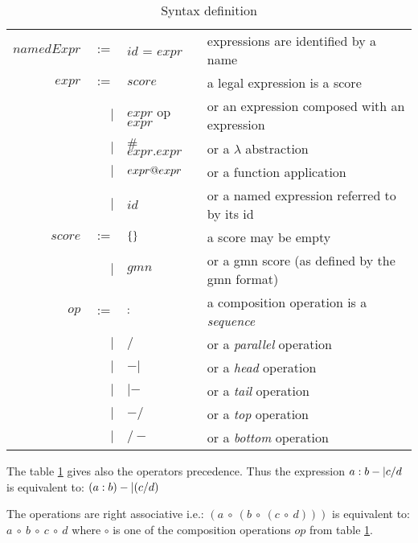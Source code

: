 \documentclass[10pt,a4paper,frenchb]{article}
\begin{document}
\begin{table}[H]
\begin{center}
\begin{tabular}{rrll}
\hline
$namedExpr$ & $:=$ & $id$ = $expr$          & expressions are identified by a name 
 \vspace{3mm} \\
$expr$ & $:=$ & $score $                 & a legal expression is a score \\
 	    & $|$ & $expr$ op $expr$         & or an expression composed with an expression \\
	    & $|$ & $\#$ $expr . expr$  & or a $\lambda$ abstraction \\
	    & $|$ & $expr @ expr$              & or a function application \\
	    & $|$ & $id$              & or a named expression referred to by its id 
\vspace{3mm} \\
$score $ & $:=$ & $\{\}$               & a score may be empty \\
	    & $|$ & $gmn$               & or a gmn score (as defined by the gmn format)
 \vspace{3mm} \\
$op$   & $:=$ & $: $            & a composition operation is a \emph{sequence}\\
 	    & $|$ & $/$            & or a \emph{parallel} operation  \\
 	    & $|$ & $-|$           & or a \emph{head} operation  \\
 	    & $|$ & $|-$           & or a \emph{tail} operation  \\
 	    & $|$ & $-/$           & or a \emph{top} operation  \\
 	    & $|$ & $/-$           & or a \emph{bottom} operation  \\
\hline
\end{tabular}
\end{center}
\vspace{-4mm}
\caption{Syntax definition}
\label{syntax}
\end{table}

The table \ref{syntax} gives also the operators precedence. Thus the expression 
$ a : b -| c / d $ is equivalent to: $ (a : b) -| (c / d) $

The operations are right associative i.e.:
$ (a\ \circ\ (b\ \circ\ (c\ \circ\ d))) $ is equivalent to: $ a\ \circ\ b\ \circ\ c\ \circ\ d $ where $\circ$ is one of the composition operations $op$ from table \ref{syntax}.
\end{document}
